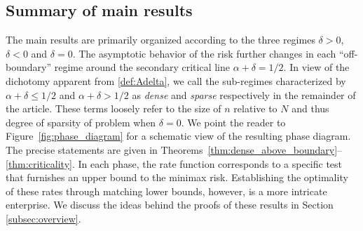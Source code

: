 \documentclass[11pt,reqno,letterpaper]{amsart}
\numberwithin{equation}{section}
\theoremstyle{plain}
\begin{document}
\subsection{Summary of main results}\label{subsec:summary} 
The main results are primarily organized according to the three regimes $\delta > 0$, $\delta < 0$ and $\delta = 0$. The asymptotic behavior of the risk further 
changes in each ``off-boundary'' regime around the secondary critical line $\alpha+\delta = 1/2$. In view of the dichotomy apparent from \eqref{def:Adelta}, we call the sub-regimes 
characterized by $\alpha + \delta \le 1/2$ and $\alpha + \delta > 1/2$ as {\em dense} and {\em 
sparse} respectively in the remainder of the article. These terms loosely refer to the 
size of $n$ relative to $N$ and thus degree of sparsity of problem when $\delta = 0$. We point the reader to Figure~\ref{fig:phase_diagram} for a schematic view of the resulting 
phase diagram. The precise statements are given in 
Theorems~\ref{thm:dense_above_boundary}--\ref{thm:criticality}. In each phase, the rate function corresponds to a specific test that furnishes 
an upper bound to the minimax risk. Establishing the optimality of these rates 
through matching lower bounds, however, is a more intricate enterprise. We discuss 
the ideas behind the proofs of these results in Section \ref{subsec:overview}.
\end{document}
